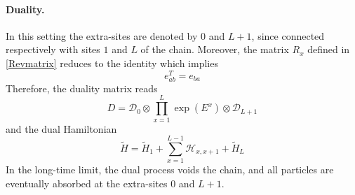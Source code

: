 \documentclass[11pt]{article}
\numberwithin{equation}{section}
\numberwithin{equation}{subsection}
\begin{document}
\paragraph{Duality.} 
In this setting the extra-sites are denoted by $0$ and $L+1$, since connected respectively with sites $1$ and $L$ of the chain. Moreover, the matrix $R_{x}$ defined in \eqref{Revmatrix} 
reduces to the identity which implies 
\begin{equation}\label{transpostionPropertyFund}
e_{ab}^T= e_{ba}
\end{equation}
 Therefore, the duality matrix reads
\begin{equation}
	D=\mathcal{D}_{0}\otimes\prod_{x=1}^{L}\exp{(E^{x})}\otimes \mathcal{D}_{L+1}
\end{equation}
and the dual Hamiltonian 
\begin{equation}
	\widetilde{H}=\widetilde{H}_{1}+\sum_{x=1}^{L-1}\mathcal{H}_{x,x+1}+\widetilde{H}_{L}
\end{equation}
In the long-time limit, the dual process voids the chain, and all particles are eventually absorbed at the extra-sites $0$ and $L+1$.
\end{document}
